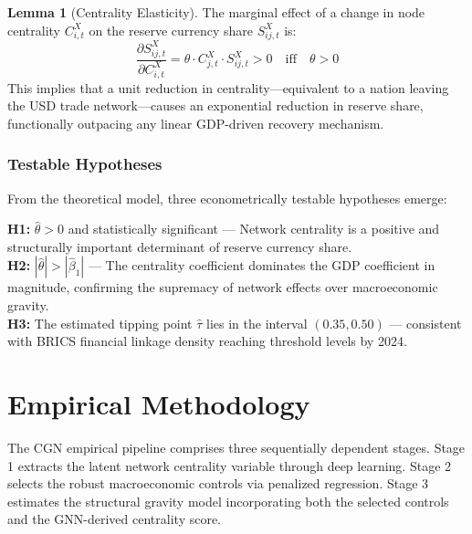 \documentclass[12pt, letterpaper]{article}
\theoremstyle{definition}
\newtheorem{lemma}{Lemma}
\begin{document}
\begin{lemma}[Centrality Elasticity]
\label{lem:centrality}
The marginal effect of a change in node centrality $C_{i,t}^X$ on the reserve currency share $S_{ij,t}^X$ is:
\[
\frac{\partial S_{ij,t}^X}{\partial C_{i,t}^X} = \theta \cdot C_{j,t}^X \cdot S_{ij,t}^X > 0 \quad \text{iff} \quad \theta > 0
\]
This implies that a unit reduction in centrality---equivalent to a nation leaving the USD trade network---causes an exponential reduction in reserve share, functionally outpacing any linear GDP-driven recovery mechanism.
\end{lemma}

\subsubsection{Testable Hypotheses}

From the theoretical model, three econometrically testable hypotheses emerge:

\begin{tcolorbox}[colback=cgngray, colframe=cgndark, title=\textbf{Hypothesis Set (H)}]
\textbf{H1:} $\hat{\theta} > 0$ and statistically significant --- Network centrality is a positive and structurally important determinant of reserve currency share.\\[4pt]
\textbf{H2:} $|\hat{\theta}| > |\hat{\beta}_1|$ --- The centrality coefficient dominates the GDP coefficient in magnitude, confirming the supremacy of network effects over macroeconomic gravity.\\[4pt]
\textbf{H3:} The estimated tipping point $\hat{\tau}$ lies in the interval $(0.35, 0.50)$ --- consistent with BRICS financial linkage density reaching threshold levels by 2024.
\end{tcolorbox}

\newpage
\section{Empirical Methodology}
\label{sec:empirics}

The CGN empirical pipeline comprises three sequentially dependent stages. Stage 1 extracts the latent network centrality variable through deep learning. Stage 2 selects the robust macroeconomic controls via penalized regression. Stage 3 estimates the structural gravity model incorporating both the selected controls and the GNN-derived centrality score.
\end{document}
